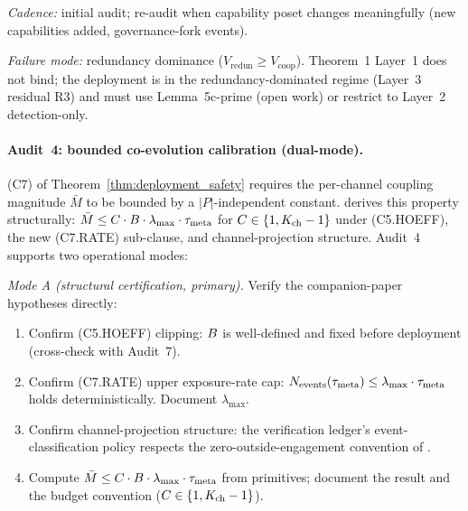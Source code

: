 \emph{Cadence:} initial audit; re-audit when capability poset
changes meaningfully (new capabilities added, governance-fork
events).

\emph{Failure mode:} redundancy dominance ($V_{\mathrm{redun}} \geq
V_{\mathrm{coop}}$). Theorem~1 Layer~1 does not bind; the deployment
is in the redundancy-dominated regime (Layer~3 residual R3) and
must use Lemma~5c-prime (open work) or restrict to Layer~2
detection-only.

\paragraph{Audit~4: bounded co-evolution calibration (dual-mode).}

(C7) of Theorem~\ref{thm:deployment_safety} requires the
per-channel coupling magnitude $\bar{M}$ to be bounded by a
$|P|$-independent constant.
\citep[Theorem~1]{lasser2026foundations} derives this property
structurally: $\bar{M} \leq C \cdot B \cdot \lambda_{\max}
\cdot \tau_{\mathrm{meta}}$ for $C \in \{1, K_{\mathrm{ch}} - 1\}$ under
(C5.HOEFF), the new (C7.RATE) sub-clause, and channel-projection
structure.  Audit~4 supports two operational modes:

\emph{Mode A (structural certification, primary).}  Verify the
companion-paper hypotheses directly:
\begin{enumerate}
\item Confirm (C5.HOEFF) clipping: $B$ is well-defined and
  fixed before deployment (cross-check with Audit~7).
\item Confirm (C7.RATE) upper exposure-rate cap:
  $N_{\mathrm{events}}(\tau_{\mathrm{meta}}) \leq \lambda_{\max} \cdot
  \tau_{\mathrm{meta}}$ holds deterministically.  Document
  $\lambda_{\max}$.
\item Confirm channel-projection structure: the verification
  ledger's event-classification policy respects the
  zero-outside-engagement convention of
  \citep[\S 2]{lasser2026foundations}.
\item Compute $\bar{M} \leq C \cdot B \cdot \lambda_{\max}
  \cdot \tau_{\mathrm{meta}}$ from primitives; document the
  result and the budget convention ($C \in \{1, K_{\mathrm{ch}} - 1\}$).
\end{enumerate}

